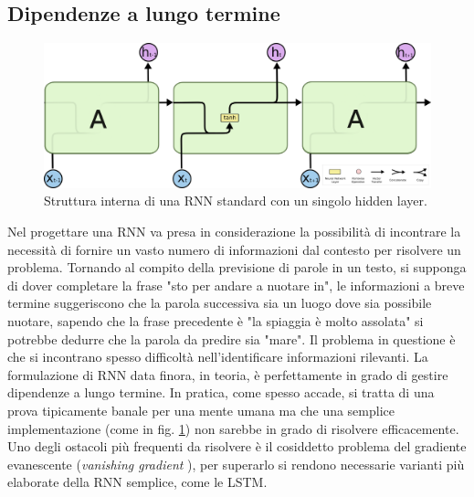 \subsection{Dipendenze a lungo termine} %
\label{sub:dipendenze_a_lungo_termine}
\begin{figure}[ht]
	\centering
	\includegraphics{img/rnn_struct.png}
	\caption{Struttura interna di una RNN standard con un singolo hidden layer.}
	\label{fig:1.8}
\end{figure}
Nel progettare una RNN va presa in considerazione la possibilità di incontrare la necessità di fornire un vasto numero di informazioni dal contesto per risolvere un problema. Tornando al compito della previsione di parole in un testo, si supponga di dover completare la frase "sto per andare a nuotare in", le informazioni a breve termine suggeriscono che la parola successiva sia un luogo dove sia possibile nuotare, sapendo che la frase precedente è "la spiaggia è molto assolata" si potrebbe dedurre che la parola da predire sia "mare". Il problema in questione è che si incontrano spesso difficoltà nell'identificare informazioni rilevanti. La formulazione di RNN data finora, in teoria, è perfettamente in grado di gestire dipendenze a lungo termine. In pratica, come spesso accade, si tratta di una prova tipicamente banale per una mente umana ma che una semplice implementazione (come in fig. \ref{fig:1.8}) non sarebbe in grado di risolvere efficacemente. Uno degli ostacoli più frequenti da risolvere è il cosiddetto problema del gradiente evanescente (\textit{vanishing gradient} \cite{vanishing}), per superarlo si rendono necessarie varianti più elaborate della RNN semplice, come le LSTM.
